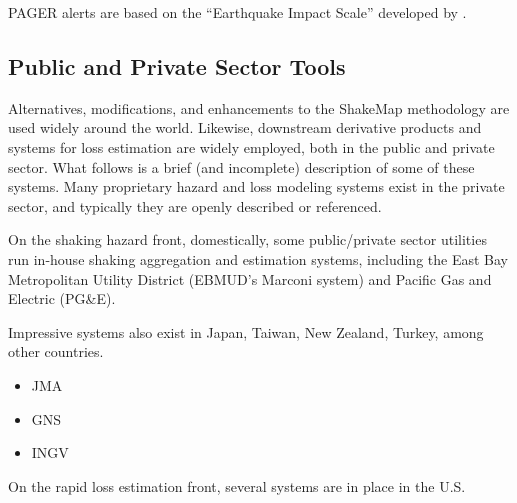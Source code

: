 \documentclass[letterpaper,10pt,english]{sphinxmanual}
\begin{document}
PAGER alerts are based on the “Earthquake Impact Scale” developed by {\hyperref[references:wald2011b]{}}.
\begin{figure}[htbp]\begin{flushright}
\capstart
\texttt{[image: \{Nepal\_M7\_8\_onepager\_V5]}.pdf}\caption{Nepal OnePAGER Alert Example}\label{related_systems:id4}\end{flushright}\end{figure}


\subsection{Public and Private Sector Tools}
\label{related_systems:public-and-private-sector-tools}
Alternatives, modifications, and enhancements to the ShakeMap methodology are
used widely around the world. Likewise, downstream derivative products and systems for loss estimation are
widely employed, both in the public and private sector. What follows is
a brief (and incomplete) description of some of these systems. Many
proprietary hazard and loss modeling systems exist in the private
sector, and typically they are openly described or referenced.

On the shaking hazard front, domestically, some public/private sector
utilities run in-house shaking aggregation and estimation systems,
including the East Bay Metropolitan Utility District (EBMUD's Marconi
system) and Pacific Gas and Electric (PG\&E).

Impressive systems also exist in Japan, Taiwan, New Zealand, Turkey,
among other countries.
\begin{itemize}
\item {} 
JMA

\item {} 
GNS

\item {} 
INGV

\end{itemize}

On the rapid loss estimation front, several systems are in place in the U.S.
\end{document}
